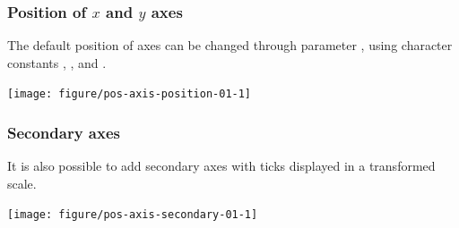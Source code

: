 \documentclass[krantz2]{krantz}\usepackage{knitr}%
\begin{document}
\subsubsection{Position of $x$ and $y$ axes}

The default position of axes can be changed through parameter , using character constants , ,  and .

\begin{knitrout}\footnotesize
{}\color{fgcolor}\begin{kframe}
\begin{alltt}
\hlstd{(}   \hlopt{+}
  \hlstd{()} \hlopt{+}
  \hlstd{(} \hlstd{=} \hlstd{)} \hlopt{+}
  \hlstd{(} \hlstd{=} \hlstd{)}
\end{alltt}
\end{kframe}

{\centering \texttt{[image: figure/pos-axis-position-01-1]} 

}



\end{knitrout}

\subsubsection{Secondary axes}

It is also possible to add secondary axes with ticks displayed in a transformed scale.

\begin{knitrout}\footnotesize
{}\color{fgcolor}\begin{kframe}
\begin{alltt}
\hlstd{(}   \hlopt{+}
  \hlstd{()} \hlopt{+}
  \hlstd{(} \hlstd{=} \hlstd{(}\hlopt{~}  \hlopt{^-}\hlstd{,}  \hlstd{=} \hlstd{) )}
\end{alltt}
\end{kframe}

{\centering \texttt{[image: figure/pos-axis-secondary-01-1]} 

}



\end{knitrout}
\end{document}
